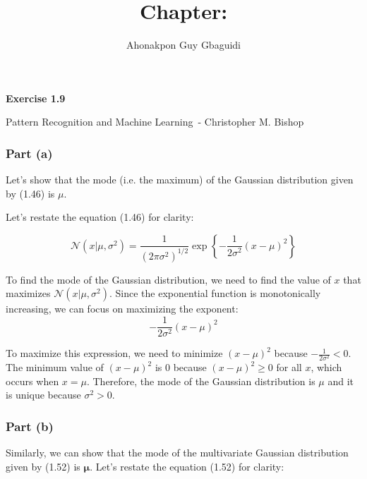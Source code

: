 \documentclass{article}
\title{Chapter: \ChapterName}
\author{Ahonakpon Guy Gbaguidi}
\date{}
\newcommand{\BookName}{Pattern Recognition and Machine Learning}
\newcommand{\BookAuthor}{Christopher M. Bishop}
\newcommand{\ExerciseID}{1.9}
\begin{document}
\maketitle

\begin{center}
  \large\textbf{Exercise \ExerciseID}

  \vspace{0.5em}

  \normalsize\BookName\ - \BookAuthor
\end{center}

\begin{tcolorbox}[breakable,colback=gray!5,colframe=gray!60,title=Solution]

\subsubsection*{Part (a)}
Let's show that the mode (i.e. the maximum) of the Gaussian distribution given by (1.46) is \( \mu \).

Let's restate the equation (1.46) for clarity:

\begin{equation}
  \mathcal{N}(x|\mu,\sigma^2) = \frac{1}{\left(2\pi\sigma^2\right)^{1/2}} \exp\left\{-\frac{1}{2\sigma^2}(x-\mu)^2\right\} \tag{1.46}
\end{equation}

To find the mode of the Gaussian distribution, we need to find the value of \( x \) that maximizes 
\( \mathcal{N}(x|\mu,\sigma^2) \). Since the exponential function is monotonically increasing, we 
can focus on maximizing the exponent:
\begin{equation}
  -\frac{1}{2\sigma^2}(x-\mu)^2
\end{equation}

To maximize this expression, we need to minimize \( (x-\mu)^2 \) because \(-\frac{1}{2\sigma^2} < 0\). 
The minimum value of \( (x-\mu)^2 \) is 0 because \((x-\mu)^2 \geq 0\) for all \( x \), 
which occurs when \( x = \mu \). Therefore, the mode of the Gaussian distribution is \( \mu \) 
and it is unique because \(\sigma^2 > 0\).

\vspace{1em}

\subsubsection*{Part (b)}
Similarly, we can show that the mode of the multivariate Gaussian distribution given by (1.52) is \( \boldsymbol{\mu} \).
Let's restate the equation (1.52) for clarity:


\end{tcolorbox}
\end{document}
